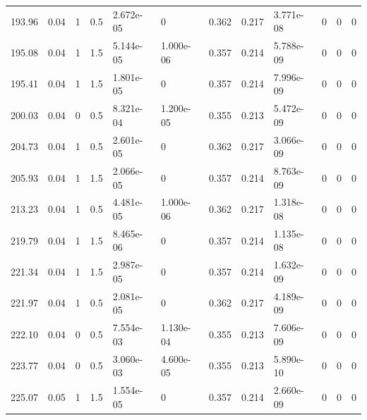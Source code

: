 \documentclass[preview]{standalone}
\begin{document}
{{\begin{tabular}{L{1.2cm}C{1.2cm} C{0.3cm}C{0.5cm} C{1.4cm}C{1.4cm} C{1.4cm}C{1.4cm} C{1.6cm}C{1.6cm} C{1.6cm}C{1.6cm}}
  193.96  &  0.04  & 1     & 0.5 &  2.672e-05  & 0  &  0.362&   0.217& 3.771e-08 & 0   &  0 & 0  \\ 
  195.08  &  0.04  & 1     & 1.5 &  5.144e-05  & 1.000e-06  &  0.357&   0.214& 5.788e-09 & 0   &  0 & 0  \\ 
  195.41  &  0.04  & 1     & 1.5 &  1.801e-05  & 0  &  0.357&   0.214& 7.996e-09 & 0   &  0 & 0  \\ 
  200.03  &  0.04  & 0     & 0.5 &  8.321e-04  & 1.200e-05  &  0.355&   0.213& 5.472e-09 & 0   &  0 & 0  \\ 
  204.73  &  0.04  & 1     & 0.5 &  2.601e-05  & 0  &  0.362&   0.217& 3.066e-09 & 0   &  0 & 0  \\ 
  205.93  &  0.04  & 1     & 1.5 &  2.066e-05  & 0  &  0.357&   0.214& 8.763e-09 & 0   &  0 & 0  \\ 
  213.23  &  0.04  & 1     & 0.5 &  4.481e-05  & 1.000e-06  &  0.362&   0.217& 1.318e-08 & 0   &  0 & 0  \\ 
  219.79  &  0.04  & 1     & 1.5 &  8.465e-06  & 0  &  0.357&   0.214& 1.135e-08 & 0   &  0 & 0  \\ 
  221.34  &  0.04  & 1     & 1.5 &  2.987e-05  & 0  &  0.357&   0.214& 1.632e-09 & 0   &  0 & 0  \\ 
  221.97  &  0.04  & 1     & 0.5 &  2.081e-05  & 0  &  0.362&   0.217& 4.189e-09 & 0   &  0 & 0  \\ 
  222.10  &  0.04  & 0     & 0.5 &  7.554e-03  & 1.130e-04  &  0.355&   0.213& 7.606e-09 & 0   &  0 & 0  \\ 
  223.77  &  0.04  & 0     & 0.5 &  3.060e-03  & 4.600e-05  &  0.355&   0.213& 5.890e-10 & 0   &  0 & 0  \\ 
  225.07  &  0.05  & 1     & 1.5 &  1.554e-05  & 0  &  0.357&   0.214& 2.660e-09 & 0   &  0 & 0  \\ 
\hline 
\end{tabular} 

}}
\end{document}
